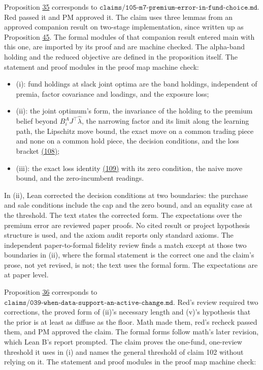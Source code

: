 \documentclass[11pt]{article}
\begin{document}
Proposition \hyperref[res:Proposition-35]{35} corresponds to
\(\texttt{claims/105-m7-premium-error-in-fund-choice.md}\). Red passed it and
PM approved it. The claim uses three lemmas from an approved companion
result on two-stage implementation, since written up as Proposition \hyperref[res:Proposition-45]{45}.
The formal modules of that companion result entered main with this one,
are imported by its proof and are machine checked. The alpha-band
holding and the reduced objective are defined in the proposition
itself. The statement and proof modules in the proof map machine check:

\begin{itemize}
  \item (i): fund holdings at slack joint optima are the band holdings,
  independent of premia, factor covariance and loadings, and the
  exposure loss;
  \item (ii): the joint optimum's form, the invariance of the holding to the
  premium belief beyond \(B^A_iJ^\top\hat\lambda\), the narrowing factor and its limit
  along the learning path, the Lipschitz move bound, the exact move on a
  common trading piece and none on a common hold piece, the decision
  conditions, and the loss bracket \hyperref[eq:108]{(108)};
  \item (iii): the exact loss identity \hyperref[eq:109]{(109)} with its zero condition, the
  naive move bound, and the zero-incumbent readings.
\end{itemize}

In (ii), Lean corrected the decision conditions at two boundaries: the
purchase and sale conditions include the cap and the zero bound, and
an equality case at the threshold. The text states the corrected form.
The expectations over the premium error are reviewed paper proofs.
No cited result or project hypothesis structure is used, and the axiom
audit reports only standard axioms. The independent paper-to-formal
fidelity review finds a match except at those two boundaries in (ii),
where the formal statement is the correct one and the claim's prose,
not yet revised, is not; the text uses the formal form. The
expectations are at paper level.

Proposition \hyperref[res:Proposition-36]{36} corresponds to
\(\texttt{claims/039-when-data-support-an-active-change.md}\). Red's review
required two corrections, the proved form of (ii)'s necessary length
and (v)'s hypothesis that the prior is at least as diffuse as the floor.
Math made them, red's recheck passed them, and PM approved the claim.
The formal forms follow math's later revision, which Lean B's report
prompted. The claim proves the one-fund, one-review threshold it uses
in (i) and names the general threshold of claim 102 without relying on
it. The statement and proof
modules in the proof map machine check:
\end{document}
